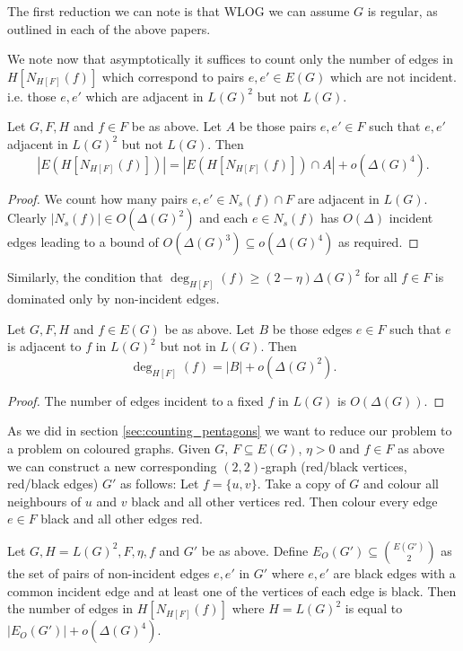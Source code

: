 \begin{note}
    The first reduction we can note is that WLOG we can assume $G$ is regular,
    as outlined in each of the above papers.
\end{note}

We note now that asymptotically it suffices to count only the number of edges
in $H[N_{H[F]}(f)]$ which correspond to pairs $e, e'\in E(G)$ which are not incident.
i.e. those $e,e'$ which are adjacent in $L(G)^2$ but not $L(G)$.
\begin{lemma}
    \label{lemma:count_non_incident_pairs}
    Let $G, F, H$ and $f\in F$ be as above. Let $A$ be those pairs $e,e'\in F$
    such that $e, e'$ adjacent in $L(G)^2$ but not $L(G)$.
    Then
    \[
        |E(H[N_{H[F]}(f)])| = |E(H[N_{H[F]}(f)]) \cap A| + o(\Delta(G)^4).
    \]
\end{lemma}
\begin{proof}
    We count how many pairs $e, e' \in N_s(f) \cap F$ are adjacent in $L(G)$.
    Clearly $|N_s(f)| \in O(\Delta(G)^2)$ and each $e \in N_s(f)$ has $O(\Delta)$
    incident edges leading to a bound of $O(\Delta(G)^3) \subseteq o(\Delta(G)^4)$
    as required.
\end{proof}

Similarly, the condition that $\deg_{H[F]}(f) \geq (2-\eta)\Delta(G)^2$ for all
$f\in F$ is dominated only by non-incident edges.
\begin{lemma}
    \label{lemma:sec_degree_non_incident}
    Let $G, F, H$ and $f\in E(G)$ be as above. Let $B$ be those edges $e\in F$
    such that $e$ is adjacent to $f$ in $L(G)^2$ but not in $L(G)$.
    Then
    \[
        \deg_{H[F]}(f) = |B| + o(\Delta(G)^2).
    \]
\end{lemma}
\begin{proof}
    The number of edges incident to a fixed $f$ in $L(G)$ is $O(\Delta(G))$.
\end{proof}

As we did in section \ref{sec:counting_pentagons} we want to reduce our problem to a
problem on coloured graphs.
Given $G$, $F\subseteq E(G)$, $\eta > 0$ and $f \in F$ as above we can construct a
new corresponding $(2,2)$-graph (red/black vertices, red/black edges) $G'$ as follows:
Let $f=\{u, v\}$. Take a copy of $G$ and colour all neighbours of $u$ and $v$ black
and all other vertices red. Then colour every edge $e \in F$ black and all other
edges red.

\begin{lemma}
    Let $G, H=L(G)^2, F, \eta, f$ and $G'$ be as above.
    Define $E_O(G') \subseteq \binom{E(G')}{2}$ as the set of pairs of non-incident
    edges $e, e'$ in $G'$
    where $e, e'$ are black edges with a common incident edge and
    at least one of the vertices of each edge is black.
    Then the number of edges in $H[N_{H[F]}(f)]$
    where $H=L(G)^2$ is equal to $|E_O(G')| + o(\Delta(G)^4)$.
\end{lemma}

